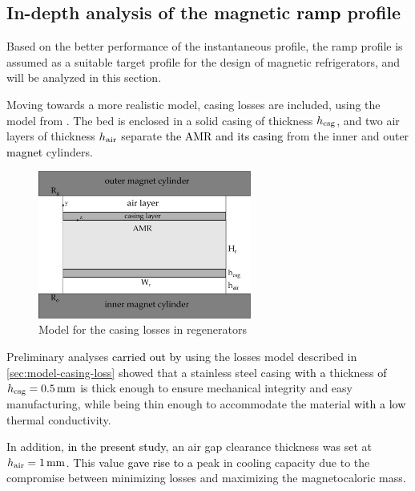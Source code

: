 \documentclass[referee]{svjour3}
\begin{document}
\subsection{In-depth analysis of the  magnetic \textcolor{black}{ramp} profile}
\label{sec:performance-an-amr-1}

Based on the better performance of the instantaneous profile, the ramp profile is assumed as a suitable target profile for the design of magnetic refrigerators, and will be analyzed in this section.

Moving towards a more realistic model, casing losses are included, using the model from \cite{bib:trevizoli16_perfor_model}. The bed is enclosed in a solid casing of thickness $h_{\mathrm{csg}}$, and two air layers of thickness $h_{\mathrm{air}}$ separate \textcolor{black}{the AMR and its casing} from the inner and outer \textcolor{black}{magnet} cylinders. 

\begin{figure}[!ht]
  \centering
  \includegraphics[width=7cm]{amr-casing}
  \caption{Model for the casing losses in regenerators}
  \label{fig:amr-casing}
\end{figure}


Preliminary analyses \textcolor{black}{carried out by} \cite{bib:peixer17-perfor-amrs} using the losses model described in \autoref{sec:model-casing-loss} showed that a stainless steel casing \textcolor{black}{with a} thickness \textcolor{black}{of} $h\ped{csg} = \SI{0.5}{\mm}$ is thick enough to ensure mechanical integrity and easy manufacturing, while being thin enough to accommodate the material \textcolor{black}{with a low} thermal conductivity. 

In addition, \textcolor{black}{in the present study}, an air gap clearance thickness was set at $h\ped{air} = \SI{1}{\mm}$. This value \textcolor{black}{gave rise to a} peak in cooling capacity due to the compromise between minimizing losses and maximizing the magnetocaloric mass.
\end{document}
